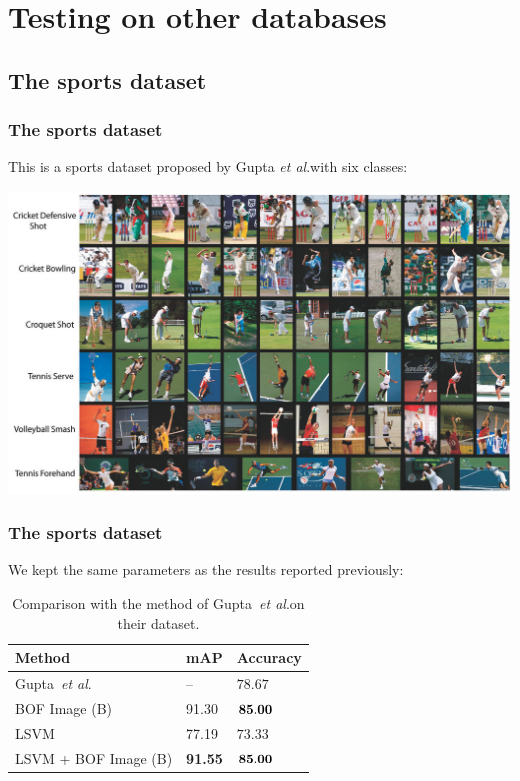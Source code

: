 \documentclass{beamer}
\def\etal{\emph{et al}.}
\begin{document}
\section{Testing on other databases}
\begin{frame}
\tableofcontents[currentsection]
\end{frame}


\subsection{The sports dataset}
\begin{frame}
\frametitle{The sports dataset}

This is a sports dataset proposed by Gupta \etal with six classes:

\center 
\includegraphics[height=0.6\linewidth]{figs/sport.png}

\end{frame}

\begin{frame}
\frametitle{The sports dataset}

We kept the same parameters as the results reported previously:

\begin{table}[t]
\centering
\begin{tabular}{|l||l|l|}
\hline
Method  				             & mAP	           & Accuracy  \\ \hline 
Gupta~\etal~~\cite{Gupta09}	 & --	             &  $78.67$ \\ \hline 
BOF Image (B) 		 	         &  91.30 	       & ${\bf 85.00} $ \\ \hline 
LSVM 			  		             & 77.19	         & $ 73.33 $ \\ \hline 
LSVM + BOF Image (B)		     & {\bf 91.55}     & $ {\bf 85.00} $ \\ \hline 
\end{tabular}
\caption{Comparison with the method of Gupta~\etal on their dataset.}
\label{tab:gupta}
\end{table}

\end{frame}
\end{document}
